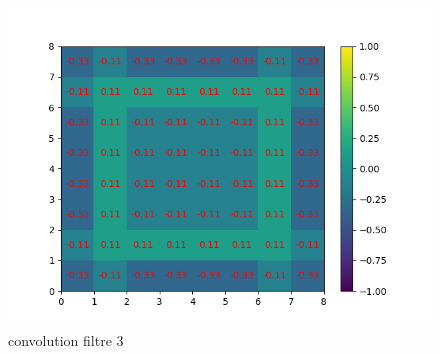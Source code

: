 \begin{figure}[h]
        \includegraphics[width=\textwidth]{img/cnn_exemple/square/convolution_filtre_3.png}
        \caption{convolution filtre 3}
    \endminipage
\end{figure}

